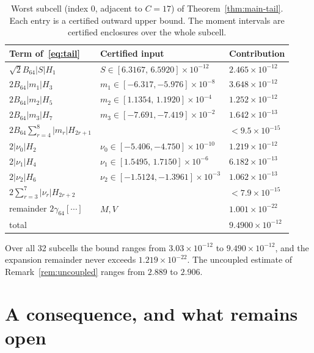 \documentclass[11pt,a4paper]{article}
\theoremstyle{definition}
\newcommand{\abs}[1]{\lvert #1\rvert}
\begin{document}
\begin{table}[ht]
\centering
\caption{Worst subcell (index 0, adjacent to $C=17$) of
Theorem~\ref{thm:main-tail}. Each entry is a certified outward upper bound.
The moment intervals are certified enclosures over the whole subcell.}
\label{tab:worst-cell}
\begin{tabular}{@{}lll@{}}
\toprule
Term of~\eqref{eq:tail} & Certified input & Contribution\\
\midrule
$\sqrt2B_{64}\abs SH_1$ & $S\in[6.3167,\,6.5920]\times10^{-12}$ & $2.465\times10^{-12}$\\
$2B_{64}\abs{m_1}H_3$ & $m_1\in[-6.317,-5.976]\times10^{-8}$ & $3.648\times10^{-12}$\\
$2B_{64}\abs{m_2}H_5$ & $m_2\in[1.1354,\,1.1920]\times10^{-4}$ & $1.252\times10^{-12}$\\
$2B_{64}\abs{m_3}H_7$ & $m_3\in[-7.691,-7.419]\times10^{-2}$ & $1.642\times10^{-13}$\\
$2B_{64}\sum_{r=4}^8\abs{m_r}H_{2r+1}$ & & $<9.5\times10^{-15}$\\
$2\abs{\nu_0}H_2$ & $\nu_0\in[-5.406,-4.750]\times10^{-10}$ & $1.219\times10^{-12}$\\
$2\abs{\nu_1}H_4$ & $\nu_1\in[1.5495,\,1.7150]\times10^{-6}$ & $6.182\times10^{-13}$\\
$2\abs{\nu_2}H_6$ & $\nu_2\in[-1.5124,-1.3961]\times10^{-3}$ & $1.062\times10^{-13}$\\
$2\sum_{r=3}^7\abs{\nu_r}H_{2r+2}$ & & $<7.9\times10^{-15}$\\
remainder $2\gamma_{64}[\cdots]$ & $M,V$ & $1.001\times10^{-22}$\\
\midrule
total & & $9.4900\times10^{-12}$\\
\bottomrule
\end{tabular}
\end{table}

Over all 32 subcells the bound ranges from $3.03\times10^{-12}$ to
$9.490\times10^{-12}$, and the expansion remainder never exceeds
$1.219\times10^{-22}$. The uncoupled estimate of
Remark~\ref{rem:uncoupled} ranges from $2.889$ to $2.906$.

\section{A consequence, and what remains open}\label{sec:limits}
\end{document}

